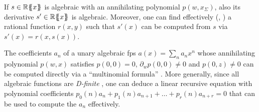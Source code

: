   
  \begin{remark}
  	\label{derivative-rational}
  	If $s\in {\mathbb{R}}\{\!\!\{x\}\!\!\}$ is algebraic with an annihilating polynomial $p(w, x_\Sigma)$,
also its derivative $s'\in {\mathbb{R}}\{\!\!\{x\}\!\!\}$ is algebraic. Moreover, one can find effectively (\cite{CHUDNOVSKY1986271}, \cite{DBLP:series/tmsc/KauersP11}) a rational function $r(x,y)$ such that $s'(x)$ can be computed from $s$ via 
 $s'(x) = r(x, s(x)) $.
  \end{remark}
    \begin{remark}
  	\label{coefficients-rational}
	The coefficients $a_n$ of a unary algebraic fps
$a(x)=\sum_n a_n x^n$ whose annihilating polynomial $p(w, x)$ satisfies $p(0,0)= 0$, $\partial_wp(0,0)\neq 0$ and $p(0,z)\neq 0$ can be computed directly via a ``multinomial formula'' \cite{BANDERIER_DRMOTA_2015}.
More generally, since all algebraic functions are \emph{D-finite} \cite{DBLP:series/tmsc/KauersP11}, one can deduce a linear recursive equation with polynomial coefficients 
$p_0(n)a_n+p_1(n)a_{n+1}+\dots +p_r(n)a_{n+r}=0$ that can be used to
compute the $a_n$ effectively.
   \end{remark}


